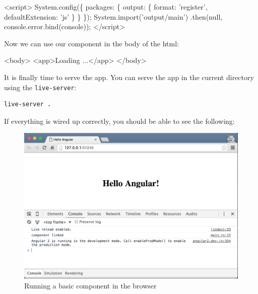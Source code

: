 \documentclass[12pt,]{article}
\newenvironment{Shaded}{}{}
\newcommand{\KeywordTok}[1]{\textcolor[rgb]{0.00,0.00,1.00}{{#1}}}
\newcommand{\DataTypeTok}[1]{{#1}}
\newcommand{\StringTok}[1]{\textcolor[rgb]{0.00,0.50,0.50}{{#1}}}
\newcommand{\SpecialStringTok}[1]{\textcolor[rgb]{0.00,0.50,0.50}{{#1}}}
\newcommand{\VariableTok}[1]{{#1}}
\newcommand{\OperatorTok}[1]{{#1}}
\newcommand{\AttributeTok}[1]{{#1}}
\newcommand{\NormalTok}[1]{{#1}}
\begin{document}
\begin{Shaded}
\begin{Highlighting}[numbers=left,,]
\KeywordTok{<script>}
  \VariableTok{System}\NormalTok{.}\AttributeTok{config}\NormalTok{(}\OperatorTok{\{}
    \DataTypeTok{packages}\OperatorTok{:} \OperatorTok{\{}
      \DataTypeTok{output}\OperatorTok{:} \OperatorTok{\{}
        \DataTypeTok{format}\OperatorTok{:} \StringTok{'register'}\OperatorTok{,}
        \DataTypeTok{defaultExtension}\OperatorTok{:} \StringTok{'js'}
      \OperatorTok{\}}
    \OperatorTok{\}}
  \OperatorTok{\}}\NormalTok{)}\OperatorTok{;}
  \VariableTok{System}\NormalTok{.}\AttributeTok{import}\NormalTok{(}\StringTok{'output/main'}\NormalTok{)}
  \NormalTok{.}\AttributeTok{then}\NormalTok{(}\KeywordTok{null}\OperatorTok{,} \VariableTok{console}\NormalTok{.}\VariableTok{error}\NormalTok{.}\AttributeTok{bind}\NormalTok{(console))}\OperatorTok{;}
\OperatorTok{<}\SpecialStringTok{/script>}
\end{Highlighting}
\end{Shaded}

Now we can use our component in the body of the html:

\begin{Shaded}
\begin{Highlighting}[numbers=left,,]
\KeywordTok{<body>}
  \KeywordTok{<app>}\NormalTok{Loading ...}\KeywordTok{</app>}
\KeywordTok{</body>}
\end{Highlighting}
\end{Shaded}

It is finally time to serve the app. You can serve the app in the
current directory using the \texttt{live-server}:

\begin{verbatim}
live-server .
\end{verbatim}

If everything is wired up correctly, you should be able to see the
following:

\begin{figure}[htbp]
\centering
\includegraphics{images/hello-angular.png}
\caption{Running a basic component in the browser}
\end{figure}
\end{document}
